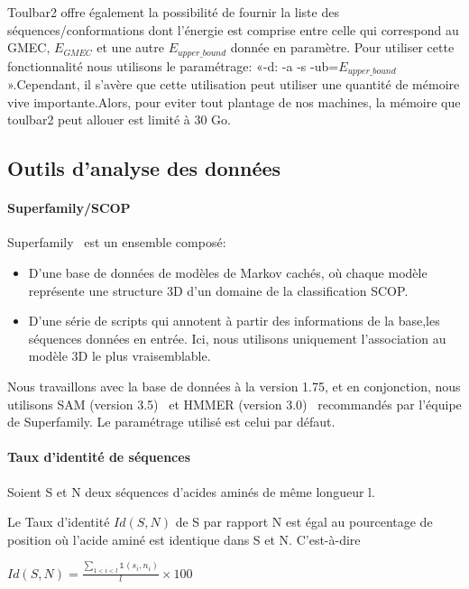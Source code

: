 Toulbar2 offre également la possibilité de fournir la liste des séquences/conformations dont l'énergie est comprise entre celle qui correspond au GMEC, $E_{GMEC}$ et une autre $E_{upper\_bound}$ donnée en paramètre. Pour utiliser cette fonctionnalité nous utilisons le paramétrage:  «-d: -a -s -ub=$E_{upper\_bound}$ ».Cependant, il s'avère que cette utilisation peut utiliser une quantité de mémoire vive importante.Alors, pour eviter tout plantage de nos machines, la mémoire que toulbar2 peut allouer est limité à 30 Go.

\subsection{Outils d'analyse des données} 
   \paragraph{Superfamily/SCOP} 

Superfamily~\citep{refSuperfamily} est un ensemble composé: 

\begin{itemize}
\item D'une base de données de modèles de Markov cachés, où chaque modèle représente une structure 3D d'un domaine de la classification SCOP.
\item D'une série de scripts qui annotent à partir des informations de la base,les séquences données en entrée. Ici, nous utilisons uniquement l'association au modèle 3D le plus vraisemblable. 
\end{itemize}

Nous travaillons avec la base de données à la version 1.75, et en conjonction, nous utilisons SAM (version 3.5)~\citep{refSam} et HMMER (version 3.0)~\citep{refHmmer} recommandés par l'équipe de Superfamily. Le paramétrage utilisé est celui par défaut.

\paragraph{Taux d'identité de séquences}

Soient S et N deux séquences d'acides aminés de même longueur l.

Le Taux d'identité $Id(S,N)$ de S par rapport N est égal au pourcentage de position où l'acide aminé est identique dans S et N. C'est-à-dire

  $ Id(S,N) =\frac{\sum_{1<i<l} \mathds{1}(s_i,n_i)}{l} \times 100$ 

